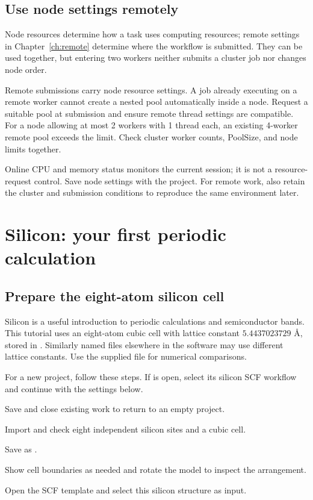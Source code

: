 \subsection{Use node settings remotely}

Node resources determine how a task uses computing resources; remote settings in Chapter~\ref{ch:remote} determine where the workflow is submitted. They can be used together, but entering two workers neither submits a cluster job nor changes node order.

Remote submissions carry node resource settings. A job already executing on a remote worker cannot create a nested pool automatically inside a node. Request a suitable pool at submission and ensure remote thread settings are compatible. For a node allowing at most 2 workers with 1 thread each, an existing 4-worker remote pool exceeds the limit. Check cluster worker counts, PoolSize, and node limits together.

Online CPU and memory status monitors the current session; it is not a resource-request control. Save node settings with the project. For remote work, also retain the cluster and submission conditions to reproduce the same environment later.

\section{Silicon: your first periodic calculation}

\subsection{Prepare the eight-atom silicon cell}

Silicon is a useful introduction to periodic calculations and semiconductor bands. This tutorial uses an eight-atom cubic cell with lattice constant $5.4437023729$ Å, stored in . Similarly named files elsewhere in the software may use different lattice constants. Use the supplied file for numerical comparisons.

For a new project, follow these steps. If  is open, select its silicon SCF workflow and continue with the settings below.

\begin{steps}
\item Save and close existing work to return to an empty project.
\item Import  and check eight independent silicon sites and a cubic cell.
\item Save as .
\item Show cell boundaries as needed and rotate the model to inspect the arrangement.
\item Open the SCF template and select this silicon structure as input.
\end{steps}

